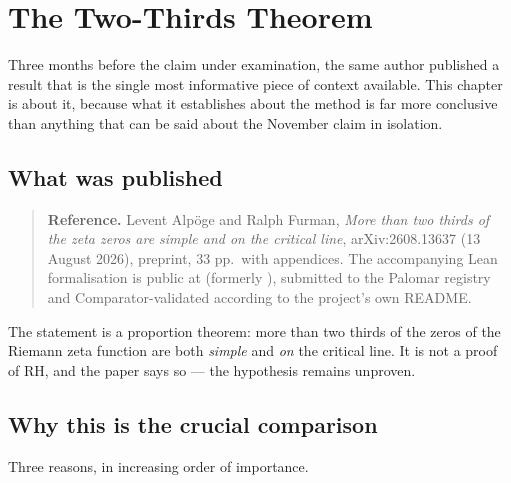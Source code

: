 
\chapter{The Two-Thirds Theorem}
\label{ch:twothirds}

Three months before the claim under examination, the same author published a
result that is the single most informative piece of context available. This
chapter is about it, because what it establishes about the method is far more
conclusive than anything that can be said about the November claim in
isolation.

\section{What was published}\begin{quote}
\textbf{Reference.} Levent Alpöge and Ralph Furman, \emph{More than two
thirds of the zeta zeros are simple and on the critical line}, arXiv:2608.13637
(13 August 2026), preprint, 33 pp.\ with appendices. The accompanying Lean
formalisation is public at  (formerly
), submitted to the Palomar registry and
Comparator-validated according to the project's own README.
\end{quote}

The statement is a proportion theorem: more than two thirds of the zeros of
the Riemann zeta function are both \emph{simple} and \emph{on} the critical
line. It is not a proof of RH, and the paper says so --- the hypothesis remains
unproven.

\section{Why this is the crucial comparison}Three reasons, in increasing order of importance.

